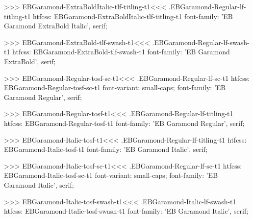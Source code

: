 {{{{{{{>>>
\<EBGaramond-ExtraBoldItalic-tlf-titling-t1\><<<
.EBGaramond-Regular-lf-titling-t1
htfcss:  EBGaramond-ExtraBoldItalic-tlf-titling-t1  font-family: 'EB Garamond ExtraBold Italic', serif;

>>>
\<EBGaramond-ExtraBold-tlf-swash-t1\><<<
.EBGaramond-Regular-lf-swash-t1
htfcss:  EBGaramond-ExtraBold-tlf-swash-t1  font-family: 'EB Garamond ExtraBold', serif;

>>>
\<EBGaramond-Regular-tosf-sc-t1\><<<
.EBGaramond-Regular-lf-sc-t1
htfcss:  EBGaramond-Regular-tosf-sc-t1  font-variant: small-caps; font-family: 'EB Garamond Regular', serif;

>>>
\<EBGaramond-Regular-tosf-t1\><<<
.EBGaramond-Regular-lf-titling-t1
htfcss:  EBGaramond-Regular-tosf-t1  font-family: 'EB Garamond Regular', serif;

>>>
\<EBGaramond-Italic-tosf-t1\><<<
.EBGaramond-Regular-lf-titling-t1
htfcss:  EBGaramond-Italic-tosf-t1  font-family: 'EB Garamond Italic', serif;

>>>
\<EBGaramond-Italic-tosf-sc-t1\><<<
.EBGaramond-Regular-lf-sc-t1
htfcss:  EBGaramond-Italic-tosf-sc-t1  font-variant: small-caps; font-family: 'EB Garamond Italic', serif;

>>>
\<EBGaramond-Italic-tosf-swash-t1\><<<
.EBGaramond-Italic-lf-swash-t1
htfcss:  EBGaramond-Italic-tosf-swash-t1  font-family: 'EB Garamond Italic', serif;

}}}}}}}
